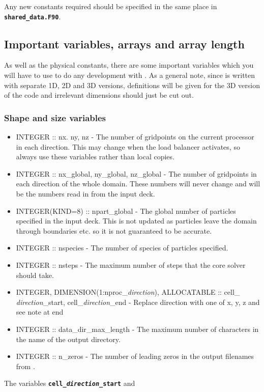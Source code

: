 \documentclass[12pt,a4paper]{article}
\newcommand{\inlinecode}[1]{{\color{warwickred} \bf\texttt{#1}}}
\newcommand{\EPOCH}{{\color{warwickdark}\fontfamily{phv}\selectfont{EPOCH}}}
\begin{document}
Any new constants required should be specified in the same place in
\inlinecode{shared\_data.F90}.

\subsection{Important variables, arrays and array length}
As well as the physical constants, there are some important variables which
you will have to use to do any development with \EPOCH. As a general note,
since {\EPOCH} is written with separate 1D, 2D and 3D versions, definitions will
be given for the 3D version of the code and irrelevant dimensions should just
be cut out.

\subsubsection{Shape and size variables}
\begin{itemize}
\item INTEGER :: nx. ny, nz - The number of gridpoints on the current
  processor in each direction. This may change when the load balancer
  activates, so always use these variables rather than local copies.
\item INTEGER :: nx\_global, ny\_global, nz\_global - The number of gridpoints
  in each direction of the whole domain. These numbers will never change and
  will be the numbers read in from the input deck.
\item INTEGER(KIND=8) :: npart\_global - The global number of particles
  specified in the input deck. This is not updated as particles leave the
  domain through boundaries etc. so it is not guaranteed to be accurate.
\item INTEGER :: nspecies - The number of species of particles specified.
\item INTEGER :: nsteps - The maximum number of steps that the core solver
  should take.
\item INTEGER, DIMENSION(1:nproc\_{\it direction}), ALLOCATABLE :: cell\_{\it
    direction}\_start, cell\_{\it direction}\_end - Replace direction with one
  of x, y, z and see note at end
\item INTEGER :: data\_dir\_max\_length - The maximum number of characters in
  the name of the output directory.
\item INTEGER :: n\_zeros - The number of leading zeros in the output filenames
  from \EPOCH.
\end{itemize}
The variables \inlinecode{cell\_{\it direction}\_start} and
\end{document}
